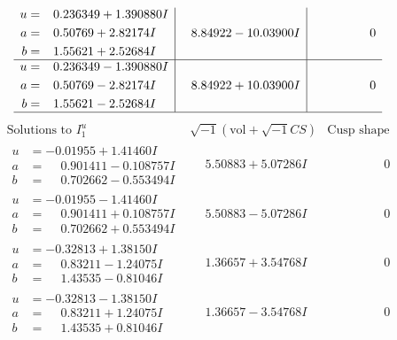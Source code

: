 \documentclass[1p]{elsarticle_modified}
\theoremstyle{definition}
\newcommand{\I}{\sqrt{-1}}
\begin{document}
$$\begin{array}{c|c|c}
\begin{aligned}
u &= \phantom{-}0.236349 + 1.390880 I \\
a &= \phantom{-}0.50769 + 2.82174 I \\
b &= \phantom{-}1.55621 + 2.52684 I\end{aligned}
 & \phantom{-}8.84922 - 10.03900 I & \phantom{-0.000000 } 0 \\ \hline\begin{aligned}
u &= \phantom{-}0.236349 - 1.390880 I \\
a &= \phantom{-}0.50769 - 2.82174 I \\
b &= \phantom{-}1.55621 - 2.52684 I\end{aligned}
 & \phantom{-}8.84922 + 10.03900 I & \phantom{-0.000000 } 0\\
 \hline 
 \end{array}$$\newpage$$\begin{array}{c|c|c}  
\text{Solutions to }I^u_{1}& \I (\text{vol} + \sqrt{-1}CS) & \text{Cusp shape}\\
 \hline 
\begin{aligned}
u &= -0.01955 + 1.41460 I \\
a &= \phantom{-}0.901411 - 0.108757 I \\
b &= \phantom{-}0.702662 - 0.553494 I\end{aligned}
 & \phantom{-}5.50883 + 5.07286 I & \phantom{-0.000000 } 0 \\ \hline\begin{aligned}
u &= -0.01955 - 1.41460 I \\
a &= \phantom{-}0.901411 + 0.108757 I \\
b &= \phantom{-}0.702662 + 0.553494 I\end{aligned}
 & \phantom{-}5.50883 - 5.07286 I & \phantom{-0.000000 } 0 \\ \hline\begin{aligned}
u &= -0.32813 + 1.38150 I \\
a &= \phantom{-}0.83211 - 1.24075 I \\
b &= \phantom{-}1.43535 - 0.81046 I\end{aligned}
 & \phantom{-}1.36657 + 3.54768 I & \phantom{-0.000000 } 0 \\ \hline\begin{aligned}
u &= -0.32813 - 1.38150 I \\
a &= \phantom{-}0.83211 + 1.24075 I \\
b &= \phantom{-}1.43535 + 0.81046 I\end{aligned}
 & \phantom{-}1.36657 - 3.54768 I & \phantom{-0.000000 } 0 \\ \hline\begin{aligned}

\end{aligned}
\end{array}$$
\end{document}

